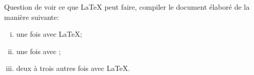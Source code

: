 \begin{exercice}[nosol]
  Question de voir ce que {\LaTeX} peut faire, compiler le document
  élaboré  de la manière suivante:
  \begin{enumerate}[i)]
  \item une fois avec {\LaTeX};
  \item une fois avec {\BibTeX};
  \item deux à trois autres fois avec {\LaTeX}.
  \end{enumerate}
\end{exercice}


